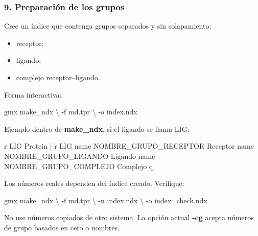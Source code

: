 \documentclass[
  spanish,
  11pt,
  a4paper]{article}
\newenvironment{Shaded}{\begin{snugshade}}{\end{snugshade}}
\newcommand{\AttributeTok}[1]{\textcolor[rgb]{0.13,0.29,0.53}{#1}}
\newcommand{\DataTypeTok}[1]{\textcolor[rgb]{0.13,0.29,0.53}{#1}}
\newcommand{\ExtensionTok}[1]{#1}
\newcommand{\NormalTok}[1]{#1}
\providecommand{\tightlist}{%
  \setlength{\itemsep}{0pt}\setlength{\parskip}{0pt}}
\begin{document}
\subsubsection{9. Preparación de los
grupos}\label{preparaciuxf3n-de-los-grupos}

Cree un índice que contenga grupos separados y sin solapamiento:

\begin{itemize}
\tightlist
\item
  receptor;
\item
  ligando;
\item
  complejo receptor--ligando.
\end{itemize}

Forma interactiva:

\begin{Shaded}
\begin{Highlighting}[]
\ExtensionTok{gmx}\NormalTok{ make\_ndx }\DataTypeTok{\textbackslash{}}
    \AttributeTok{{-}f}\NormalTok{ md.tpr }\DataTypeTok{\textbackslash{}}
    \AttributeTok{{-}o}\NormalTok{ index.ndx}
\end{Highlighting}
\end{Shaded}

Ejemplo dentro de \textbf{make\_ndx}, si el ligando se llama LIG:

\begin{Shaded}
\begin{Highlighting}[]
\NormalTok{r LIG}
\NormalTok{Protein | r LIG}
\NormalTok{name NOMBRE\_GRUPO\_RECEPTOR Receptor}
\NormalTok{name NOMBRE\_GRUPO\_LIGANDO Ligando}
\NormalTok{name NOMBRE\_GRUPO\_COMPLEJO Complejo}
\NormalTok{q}
\end{Highlighting}
\end{Shaded}

Los números reales dependen del índice creado. Verifique:

\begin{Shaded}
\begin{Highlighting}[]
\ExtensionTok{gmx}\NormalTok{ make\_ndx }\DataTypeTok{\textbackslash{}}
    \AttributeTok{{-}f}\NormalTok{ md.tpr }\DataTypeTok{\textbackslash{}}
    \AttributeTok{{-}n}\NormalTok{ index.ndx }\DataTypeTok{\textbackslash{}}
    \AttributeTok{{-}o}\NormalTok{ index\_check.ndx}
\end{Highlighting}
\end{Shaded}

No use números copiados de otro sistema. La opción actual \textbf{-cg}
acepta números de grupo basados en cero o nombres.
\end{document}
